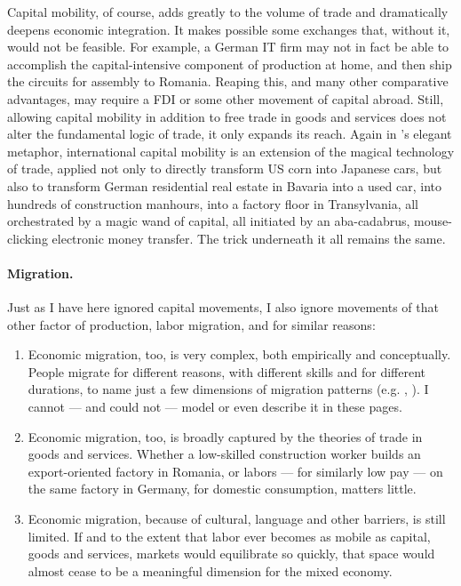 \documentclass[11pt,a4paper,oneside]{article}
\begin{document}
Capital mobility, of course, adds greatly to the volume of trade and dramatically deepens economic integration. 
It makes possible some exchanges that, without it, would not be feasible. 
For example, a German IT firm may not in fact be able to accomplish the capital-intensive component of production at home, and then ship the circuits for assembly to Romania. 
Reaping this, and many other comparative advantages, may require a \gls{FDI} or some other movement of capital abroad. 
Still, allowing capital mobility in addition to free trade in goods and services does not alter the fundamental logic of trade, it only expands its reach. 
Again in \citeauthor{Mankiw-2004-aa}'s elegant metaphor, international capital mobility is an extension of the magical technology of trade, applied not only to directly transform US corn into Japanese cars, but also to transform German residential real estate in Bavaria into a used car, into hundreds of construction manhours, into a factory floor in Transylvania, all orchestrated by a magic wand of capital, all initiated by an aba-cadabrus, mouse-clicking electronic money transfer. 
The trick underneath it all remains the same.

\paragraph{Migration.} 
Just as I have here ignored capital movements, I also ignore movements of that other factor of production, labor migration, and for similar reasons:
\begin{enumerate}
	\item Economic migration, too, is very complex, both empirically and conceptually. 
	People migrate for different reasons, with different skills and for different durations, to name just a few dimensions of migration patterns (e.g. \citealt{DeSimone2008}, \citealt{Bems2008}). 
	I cannot --- and could not --- model or even describe it in these pages.
	\item Economic migration, too, is broadly captured by the theories of trade in goods and services. 
	Whether a low-skilled construction worker builds an export-oriented factory in Romania, or labors --- for similarly low pay --- on the same factory in Germany, for domestic consumption, matters little. 
	\item Economic migration, because of cultural, language and other barriers, is still limited. 
	If and to the extent that labor ever becomes as mobile as capital, goods and services, markets would equilibrate so quickly, that space would almost cease to be a meaningful dimension for the mixed economy.
\end{enumerate}
\end{document}
